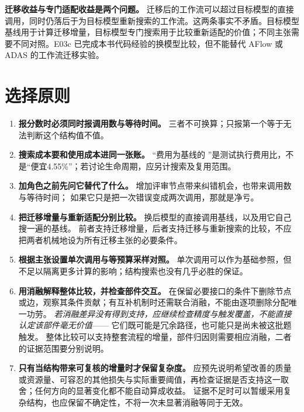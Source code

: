 \begin{principlebox}
\textbf{迁移收益与专门适配收益是两个问题。}
迁移后的工作流可以超过目标模型的直接调用，同时仍落后于为目标模型重新搜索的工作流。这两条事实不矛盾。目标模型基线用于计算迁移增量，目标模型专门搜索用于比较重新适配的价值；不同主张需要不同对照。E03c 已完成本书代码经验的换模型比较，但不能替代 AFlow 或 ADAS 的工作流迁移实验。
\end{principlebox}

\section{选择原则}
\label{sec:ch09-choice}

\begin{enumerate}
  \item \textbf{报分数时必须同时报调用数与等待时间。}
        三者不可换算；只报第一个等于无法判断这个结构值不值。
  \item \textbf{搜索成本要和使用成本进同一张账。}
        “费用为基线的 ”是测试执行费用比，不是“便宜4.55\%”；若讨论生命周期，应另计搜索及复用范围。
  \item \textbf{加角色之前先问它替代了什么。}
        增加评审节点带来纠错机会，也带来调用数与等待时间；
        如果它只是把一次错误变成两次调用，那就是净亏。
  \item \textbf{把迁移增量与重新适配分别比较。}
        换后模型的直接调用基线，以及用它自己搜一遍的基线。
        前者支持迁移增量，后者支持迁移与重新搜索的比较，不应把两者机械地设为所有迁移主张的必要条件。
  \item \textbf{根据主张设置单次调用与等预算采样对照。}
        单次调用可以作为基础参照，但不足以隔离更多计算的影响；结构搜索也没有几乎必胜的保证。
  \item \textbf{用消融解释整体比较，并检查部件交互。}
        在保留必要接口的条件下删除节点或边，观察其条件贡献；有互补机制时还需联合消融，不能由逐项删除分配唯一功劳。
        \emph{若消融差异没有得到支持，应继续检查精度与触发覆盖，不能直接认定该部件毫无价值}——
        它们既可能是冗余路径，也可能只是尚未被这批题触发。
        整体比较可以支持整套流程的增量，部件归因则需要相应消融，二者的证据范围要分别说明。
  \item \textbf{只有当结构带来可复核的增量时才保留复杂度。}
        应预先说明希望改善的质量或资源量、可容忍的其他损失与实际重要阈值，再检查证据是否支持这一取舍；任何方向的显著变化都不能自动算成收益。
        证据不足时可以暂缓采用复杂结构，也应保留不确定性，不将一次未显著消融等同于无效。
\end{enumerate}

